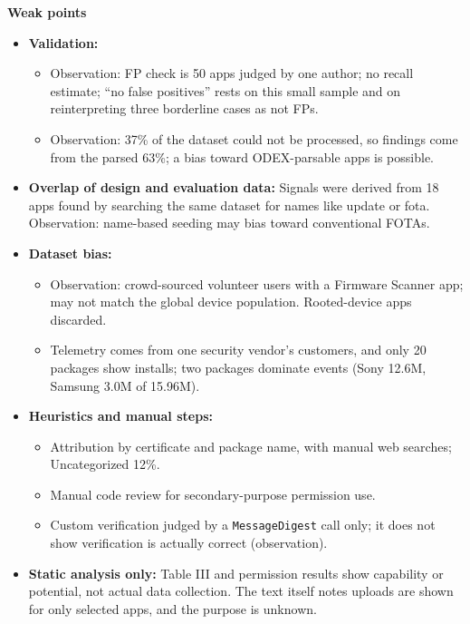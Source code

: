 \documentclass[11pt,a4paper]{article}
\begin{document}
\begin{enumerate}
    \vspace{4pt}
    \textbf{Weak points}
    \begin{itemize}[leftmargin=*,itemsep=1pt,topsep=2pt]
        \item \textbf{Validation:}
        \begin{itemize}[itemsep=0pt]
            \item Observation: FP check is 50 apps judged by one author; no recall estimate; ``no false positives'' rests on this small sample and on reinterpreting three borderline cases as not FPs.
            \item Observation: 37\% of the dataset could not be processed, so findings come from the parsed 63\%; a bias toward ODEX-parsable apps is possible.
        \end{itemize}
        \item \textbf{Overlap of design and evaluation data:} Signals were derived from 18 apps found by searching the same dataset for names like update or fota. Observation: name-based seeding may bias toward conventional FOTAs.
        \item \textbf{Dataset bias:}
        \begin{itemize}[itemsep=0pt]
            \item Observation: crowd-sourced volunteer users with a Firmware Scanner app; may not match the global device population. Rooted-device apps discarded.
            \item Telemetry comes from one security vendor's customers, and only 20 packages show installs; two packages dominate events (Sony 12.6M, Samsung 3.0M of 15.96M).
        \end{itemize}
        \item \textbf{Heuristics and manual steps:}
        \begin{itemize}[itemsep=0pt]
            \item Attribution by certificate and package name, with manual web searches; Uncategorized 12\%.
            \item Manual code review for secondary-purpose permission use.
            \item Custom verification judged by a \texttt{MessageDigest} call only; it does not show verification is actually correct (observation).
        \end{itemize}
        \item \textbf{Static analysis only:} Table III and permission results show capability or potential, not actual data collection. The text itself notes uploads are shown for only selected apps, and the purpose is unknown.

\end{itemize}
\end{enumerate}
\end{document}

